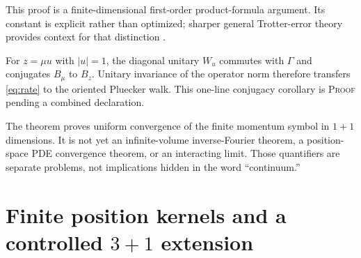 \documentclass[11pt]{article}
\newcommand{\Human}{\textcolor{humanproofcolor}{\textsc{Proof}}}
\begin{document}
This proof is a finite-dimensional first-order product-formula argument.  Its
constant is explicit rather than optimized; sharper general Trotter-error
theory provides context for that distinction \cite{ChildsTrotter}.

For $z=\mu u$ with $|u|=1$, the diagonal unitary $W_u$ commutes with $\Gamma$
and conjugates $B_\mu$ to $B_z$.  Unitary invariance of the operator norm
therefore transfers \eqref{eq:rate} to the oriented Pluecker walk.  This
one-line conjugacy corollary is \Human{} pending a combined declaration.

The theorem proves uniform convergence of the finite momentum symbol in
$1+1$ dimensions.  It is not yet an infinite-volume inverse-Fourier theorem,
a position-space PDE convergence theorem, or an interacting limit.  Those
quantifiers are separate problems, not implications hidden in the word
``continuum.''

\section{Finite position kernels and a controlled $3+1$ extension}
\label{sec:threeplusone}
\end{document}

